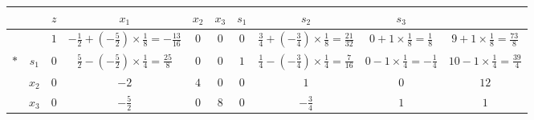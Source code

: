 \documentclass[a4paper,12pt]{article}
\begin{document}
\begin{table}[H]
    \tiny
    \begin{tabularx}{\textwidth}{cc|ccccccc|c}
            &       & $z$ & $x_1$                                                               & $x_2$ & $x_3$ & $s_1$ & $s_2$                                                             & $s_3$                                     &                                            \\
        \hline
            &       & $1$ & $-\frac{1}{2} + (-\frac{5}{2}) \times \frac{1}{8} = -\frac{13}{16}$ & $0$   & $0$   & $0$   & $\frac{3}{4} + (-\frac{3}{4}) \times \frac{1}{8} = \frac{21}{32}$ & $0 + 1 \times \frac{1}{8} = \frac{1}{8}$  & $9 + 1 \times \frac{1}{8} = \frac{73}{8}$  \\
        \hline
        $*$ & $s_1$ & $0$ & $\frac{5}{2} - (-\frac{5}{2}) \times \frac{1}{4} = \frac{25}{8}$    & $0$   & $0$   & $1$   & $\frac{1}{4} - (-\frac{3}{4}) \times \frac{1}{4} = \frac{7}{16}$  & $0 - 1 \times \frac{1}{4} = -\frac{1}{4}$ & $10 - 1 \times \frac{1}{4} = \frac{39}{4}$ \\
            & $x_2$ & $0$ & $-2$                                                                & $4$   & $0$   & $0$   & $1$                                                               & $0$                                       & $12$                                       \\
            & $x_3$ & $0$ & $-\frac{5}{2}$                                                      & $0$   & $8$   & $0$   & $-\frac{3}{4}$                                                    & $1$                                       & $1$                                        \\
    \end{tabularx}
\end{table}
\end{document}
